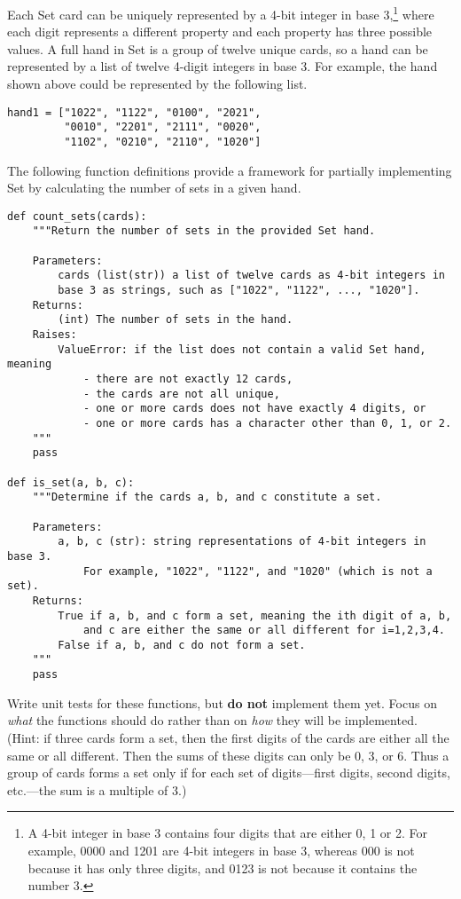 \begin{problem}
Each Set card can be uniquely represented by a 4-bit integer in base 3,\footnote{A 4-bit integer in base 3 contains four digits that are either 0, 1 or 2. For example, 0000 and 1201 are 4-bit integers in base 3, whereas 000 is not because it has only three digits, and 0123 is not because it contains the number 3.} where each digit represents a different property and each property has three possible values.
A full hand in Set is a group of twelve unique cards, so a hand can be represented by a list of twelve 4-digit integers in base 3.
For example, the hand shown above could be represented by the following list.

\begin{lstlisting}
hand1 = ["1022", "1122", "0100", "2021",
         "0010", "2201", "2111", "0020",
         "1102", "0210", "2110", "1020"]
\end{lstlisting}

The following function definitions provide a framework for partially implementing Set by calculating the number of sets in a given hand. %

\newpage

\begin{lstlisting}
def count_sets(cards):
    """Return the number of sets in the provided Set hand.

    Parameters:
        cards (list(str)) a list of twelve cards as 4-bit integers in
        base 3 as strings, such as ["1022", "1122", ..., "1020"].
    Returns:
        (int) The number of sets in the hand.
    Raises:
        ValueError: if the list does not contain a valid Set hand, meaning
            - there are not exactly 12 cards,
            - the cards are not all unique,
            - one or more cards does not have exactly 4 digits, or
            - one or more cards has a character other than 0, 1, or 2.
    """
    pass

def is_set(a, b, c):
    """Determine if the cards a, b, and c constitute a set.

    Parameters:
        a, b, c (str): string representations of 4-bit integers in base 3.
            For example, "1022", "1122", and "1020" (which is not a set).
    Returns:
        True if a, b, and c form a set, meaning the ith digit of a, b,
            and c are either the same or all different for i=1,2,3,4.
        False if a, b, and c do not form a set.
    """
    pass
\end{lstlisting}

Write unit tests for these functions, but \textbf{do not} implement them yet.
Focus on \emph{what} the functions should do rather than on \emph{how} they will be implemented.
\\ (Hint: if three cards form a set, then the first digits of the cards are either all the same or all different.
Then the sums of these digits can only be 0, 3, or 6.
Thus a group of cards forms a set only if for each set of digits---first digits, second digits, etc.---the sum is a multiple of 3.)
\label{prob:tdd_tests}
\end{problem}

